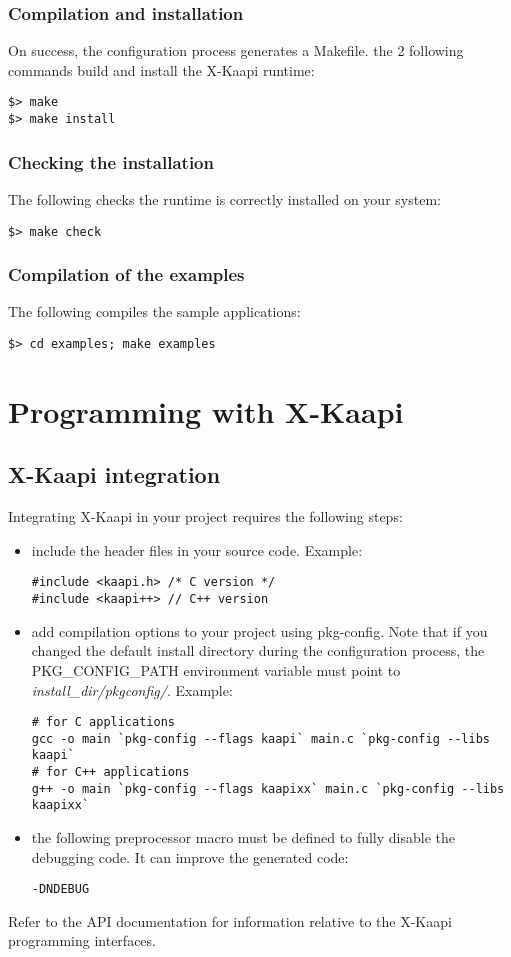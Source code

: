 \documentclass{article}
\newcommand{\kaapi}{\textsc{X}-Kaapi\xspace}
\begin{document}
\subsubsection{Compilation and installation}
On success, the configuration process generates a Makefile. the 2 following
commands build and install the \kaapi runtime:
\begin{verbatim}
$> make
$> make install
\end{verbatim}

\subsubsection{Checking the installation}
The following checks the runtime is correctly installed on your system:
\begin{verbatim}
$> make check
\end{verbatim}

\subsubsection{Compilation of the examples}
The following compiles the sample applications:
\begin{verbatim}
$> cd examples; make examples
\end{verbatim}

\section{Programming with \kaapi}
\subsection{\kaapi integration}
Integrating \kaapi in your project requires the following steps:
\begin{itemize}
\item include the header files in your source code. Example:
\begin{verbatim} 
#include <kaapi.h> /* C version */
#include <kaapi++> // C++ version
\end{verbatim}
\item add compilation options to your project using pkg-config.
Note that if you changed the default install directory during
the configuration process, the PKG\_CONFIG\_PATH environment
variable must point to \textit{install\_dir/pkgconfig/}.
Example:
\begin{verbatim} 
# for C applications
gcc -o main `pkg-config --flags kaapi` main.c `pkg-config --libs kaapi`
# for C++ applications
g++ -o main `pkg-config --flags kaapixx` main.c `pkg-config --libs kaapixx`
\end{verbatim}
\item the following preprocessor macro must be defined to fully disable
the debugging code. It can improve the generated code:
\begin{verbatim}
-DNDEBUG
\end{verbatim}



\end{itemize}
Refer to the API documentation for information relative
to the \kaapi programming interfaces.
\end{document}
